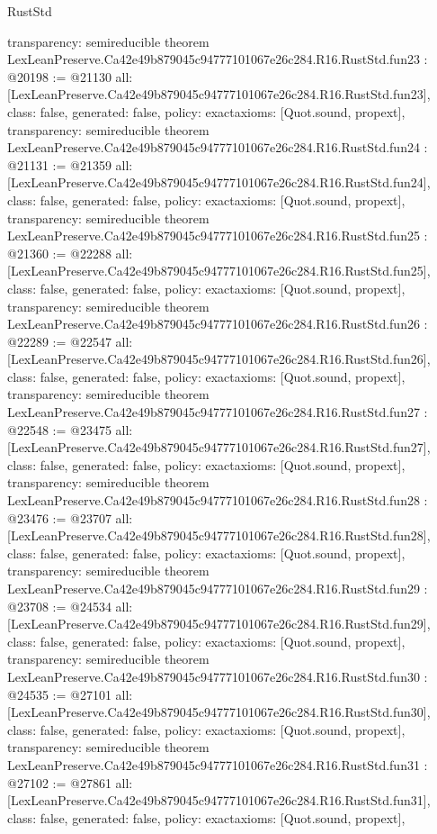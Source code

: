 \begin{lexlean}{RustStd}
\begin{coremodule}
{  transparency: semireducible
}
theorem LexLeanPreserve.Ca42e49b879045c94777101067e26c284.R16.RustStd.fun23 : @20198 := @21130 {
  all: [LexLeanPreserve.Ca42e49b879045c94777101067e26c284.R16.RustStd.fun23],
  class: false,
  generated: false,
  policy: exact{axioms: [Quot.sound, propext]},
  transparency: semireducible
}
theorem LexLeanPreserve.Ca42e49b879045c94777101067e26c284.R16.RustStd.fun24 : @21131 := @21359 {
  all: [LexLeanPreserve.Ca42e49b879045c94777101067e26c284.R16.RustStd.fun24],
  class: false,
  generated: false,
  policy: exact{axioms: [Quot.sound, propext]},
  transparency: semireducible
}
theorem LexLeanPreserve.Ca42e49b879045c94777101067e26c284.R16.RustStd.fun25 : @21360 := @22288 {
  all: [LexLeanPreserve.Ca42e49b879045c94777101067e26c284.R16.RustStd.fun25],
  class: false,
  generated: false,
  policy: exact{axioms: [Quot.sound, propext]},
  transparency: semireducible
}
theorem LexLeanPreserve.Ca42e49b879045c94777101067e26c284.R16.RustStd.fun26 : @22289 := @22547 {
  all: [LexLeanPreserve.Ca42e49b879045c94777101067e26c284.R16.RustStd.fun26],
  class: false,
  generated: false,
  policy: exact{axioms: [Quot.sound, propext]},
  transparency: semireducible
}
theorem LexLeanPreserve.Ca42e49b879045c94777101067e26c284.R16.RustStd.fun27 : @22548 := @23475 {
  all: [LexLeanPreserve.Ca42e49b879045c94777101067e26c284.R16.RustStd.fun27],
  class: false,
  generated: false,
  policy: exact{axioms: [Quot.sound, propext]},
  transparency: semireducible
}
theorem LexLeanPreserve.Ca42e49b879045c94777101067e26c284.R16.RustStd.fun28 : @23476 := @23707 {
  all: [LexLeanPreserve.Ca42e49b879045c94777101067e26c284.R16.RustStd.fun28],
  class: false,
  generated: false,
  policy: exact{axioms: [Quot.sound, propext]},
  transparency: semireducible
}
theorem LexLeanPreserve.Ca42e49b879045c94777101067e26c284.R16.RustStd.fun29 : @23708 := @24534 {
  all: [LexLeanPreserve.Ca42e49b879045c94777101067e26c284.R16.RustStd.fun29],
  class: false,
  generated: false,
  policy: exact{axioms: [Quot.sound, propext]},
  transparency: semireducible
}
theorem LexLeanPreserve.Ca42e49b879045c94777101067e26c284.R16.RustStd.fun30 : @24535 := @27101 {
  all: [LexLeanPreserve.Ca42e49b879045c94777101067e26c284.R16.RustStd.fun30],
  class: false,
  generated: false,
  policy: exact{axioms: [Quot.sound, propext]},
  transparency: semireducible
}
theorem LexLeanPreserve.Ca42e49b879045c94777101067e26c284.R16.RustStd.fun31 : @27102 := @27861 {
  all: [LexLeanPreserve.Ca42e49b879045c94777101067e26c284.R16.RustStd.fun31],
  class: false,
  generated: false,
  policy: exact{axioms: [Quot.sound, propext]},
}
\end{coremodule}
\end{lexlean}
